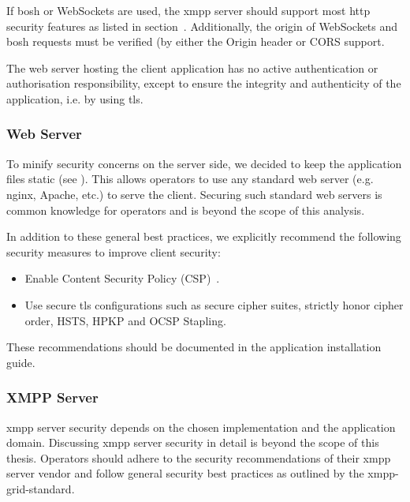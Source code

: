 If \gls{bosh} or WebSockets are used, the \gls{xmpp} server should support most \gls{http} security features as listed in section~. Additionally, the origin of WebSockets and \gls{bosh} requests must be verified (by either the Origin header or CORS support.~\cite{rfc6455}\cite{cross-origin-resource-sharing}

The web server hosting the client application has no active authentication or authorisation responsibility, except to ensure the integrity and authenticity of the application, i.e. by using \gls{tls}.

\subsubsection{Web Server}\label{sec:web-server}

To minify security concerns on the server side, we decided to keep the application files static (see ).
This allows operators to use any standard web server (e.g. nginx, Apache, etc.) to serve the client.
Securing such standard web servers is common knowledge for operators and is beyond the scope of this analysis.

In addition to these general best practices, we explicitly recommend the following security measures to improve client security:

\begin{itemize}
    \item Enable Content Security Policy (CSP)~\cite{w3c-csp}.
    \item Use secure \gls{tls} configurations such as secure cipher suites, strictly honor cipher order, HSTS, HPKP and OCSP Stapling\cite{mozilla-tls-recommendations}.
\end{itemize}

These recommendations should be documented in the application installation guide.

\subsubsection{XMPP Server}

\gls{xmpp} server security depends on the chosen implementation and the application domain.
Discussing \gls{xmpp} server security in detail is beyond the scope of this thesis.
Operators should adhere to the security recommendations of their \gls{xmpp} server vendor and follow general security best practices as outlined by the \gls{xmpp-grid-standard}.

